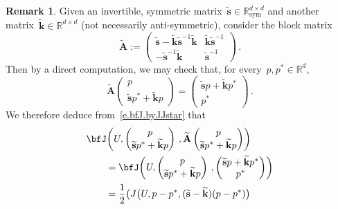 \documentclass[11pt,twoside]{article} %
\numberwithin{equation}{section}
\theoremstyle{definition}
\newtheorem{remark}[theorem]{Remark}
\newcommand*{\R}{\ensuremath{\mathbb{R}}}
\newcommand*{\Rd}{\ensuremath{\mathbb{R}^d}}
\renewcommand*{\tilde}{\widetilde}
\begin{document}
\begin{remark}
Given an invertible, symmetric matrix~$\tilde{\mathbf{s}} \in\R^{d\times d}_{\mathrm{sym}}$ and another matrix~$\tilde{\mathbf{k}}\in \R^{d\times d}$ (not necessarily anti-symmetric), consider the block matrix
\begin{equation}
\label{e.tildes.relate}
\tilde{\mathbf{A}}
:=
\begin{pmatrix} \tilde{\mathbf{s}} - \tilde{\mathbf{k}}\tilde{\mathbf{s}}^{-1}\tilde{\mathbf{k}} & \tilde{\mathbf{k}}\tilde{\mathbf{s}}^{-1} \\ - \tilde{\mathbf{s}}^{-1}\tilde{\mathbf{k}} & \tilde{\mathbf{s}}^{-1} \end{pmatrix}
\,.
\end{equation}
Then by a direct computation, we may check that, for every~$p,p^*\in\Rd$, 
\begin{equation*}
\tilde{\mathbf{A}}  
\begin{pmatrix} p \\ \tilde{\mathbf{s}} p^* + \tilde{\mathbf{k}} p  \end{pmatrix}
=
\begin{pmatrix} \tilde{\mathbf{s}} p + \tilde{\mathbf{k}} p^* \\ p^*  \end{pmatrix} 
\,.
\end{equation*}
We therefore deduce from~\eqref{e.bfJ.byJJstar} that 
\begin{align}
\label{e.bfJ.to.JJstar2}
\lefteqn{
\bfJ
\biggl(U, \begin{pmatrix} p \\ \tilde{\mathbf{s}} p^* + \tilde{\mathbf{k}} p  \end{pmatrix} \,, 
\tilde{\mathbf{A}} \begin{pmatrix} p \\ \tilde{\mathbf{s}} p^* + \tilde{\mathbf{k}} p  \end{pmatrix}
\biggr)
} \qquad & 
\notag \\ & 
=
\bfJ
\biggl(U, \begin{pmatrix} p \\ \tilde{\mathbf{s}} p^* + \tilde{\mathbf{k}} p  \end{pmatrix} \,, 
\begin{pmatrix} \tilde{\mathbf{s}} p + \tilde{\mathbf{k}} p^* \\ p^*  \end{pmatrix}
\biggr)
\notag \\ &
=
\frac12 \bigl ( J\bigl(U,p-p^*,
(\tilde{\mathbf{s}}-\tilde{\mathbf{k}}) (p-p^*)  \bigr) 

\end{align}
\end{remark}
\end{document}
